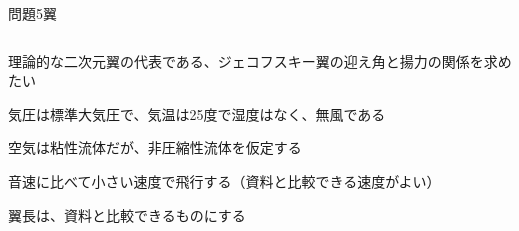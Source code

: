 \documentclass[dvipdfmx]{beamer}
\newenvironment{wideitemize}{\itemize\setlength{\itemsep}{1em}}{\enditemize}
\newenvironment{wideitemize2}{\itemize\setlength{\itemsep}{0.2em}}{\enditemize}
\begin{document}

\begin{frame}{問題5}{翼}
\begin{columns}[t]
\begin{column}{0.7\textwidth}
\begin{wideitemize}
	\item 理論的な二次元翼の代表である、ジェコフスキー翼の迎え角と揚力の関係を求めたい
	\begin{wideitemize2}
		\item 気圧は標準大気圧で、気温は25度で湿度はなく、無風である
		\item 空気は粘性流体だが、非圧縮性流体を仮定する
		\item 音速に比べて小さい速度で飛行する（資料と比較できる速度がよい）
		\item 翼長は、資料と比較できるものにする
	\end{wideitemize2}
\end{wideitemize}


\end{column}
\end{columns}
\end{frame}
\end{document}
